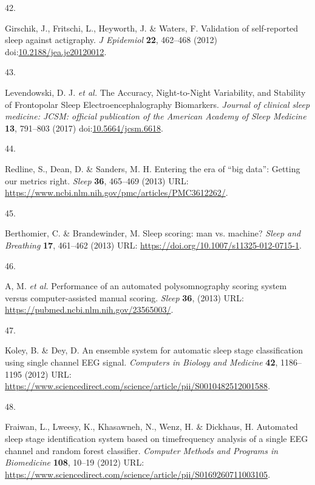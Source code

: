 \documentclass[
  10pt,
]{scrbook}
\newlength{\cslhangindent}
\newlength{\csllabelwidth}
\newlength{\cslentryspacingunit} %
\newenvironment{CSLReferences}[2] %
 {%
  \setlength{\parindent}{0pt}
  \ifodd #1
  \let\oldpar\par
  \def\par{\hangindent=\cslhangindent\oldpar}
  \fi
  \setlength{\parskip}{#2\cslentryspacingunit}
 }%
 {}
\newcommand{\CSLLeftMargin}[1]{\parbox[t]{\csllabelwidth}{#1}}
\newcommand{\CSLRightInline}[1]{\parbox[t]{\linewidth - \csllabelwidth}{#1}\break}
\begin{document}
\begin{CSLReferences}{0}{0}
\leavevmode{}%
\CSLLeftMargin{42. }%
\CSLRightInline{Girschik, J., Fritschi, L., Heyworth, J. \& Waters, F.
Validation of self-reported sleep against actigraphy. \emph{J Epidemiol}
\textbf{22}, 462--468 (2012)
doi:\href{https://doi.org/10.2188/jea.je20120012}{10.2188/jea.je20120012}.}

\leavevmode{}%
\CSLLeftMargin{43. }%
\CSLRightInline{Levendowski, D. J. \emph{et al.} The Accuracy,
Night-to-Night Variability, and Stability of Frontopolar Sleep
Electroencephalography Biomarkers. \emph{Journal of clinical sleep
medicine: JCSM: official publication of the American Academy of Sleep
Medicine} \textbf{13}, 791--803 (2017)
doi:\href{https://doi.org/10.5664/jcsm.6618}{10.5664/jcsm.6618}.}

\leavevmode{}%
\CSLLeftMargin{44. }%
\CSLRightInline{Redline, S., Dean, D. \& Sanders, M. H. Entering the era
of {``}big data{''}: Getting our metrics right. \emph{Sleep}
\textbf{36}, 465--469 (2013) URL:
\url{https://www.ncbi.nlm.nih.gov/pmc/articles/PMC3612262/}.}

\leavevmode{}%
\CSLLeftMargin{45. }%
\CSLRightInline{Berthomier, C. \& Brandewinder, M. Sleep scoring: man
vs. machine? \emph{Sleep and Breathing} \textbf{17}, 461--462 (2013)
URL: \url{https://doi.org/10.1007/s11325-012-0715-1}.}

\leavevmode{}%
\CSLLeftMargin{46. }%
\CSLRightInline{A, M. \emph{et al.} Performance of an automated
polysomnography scoring system versus computer-assisted manual scoring.
\emph{Sleep} \textbf{36}, (2013) URL:
\url{https://pubmed.ncbi.nlm.nih.gov/23565003/}.}

\leavevmode{}%
\CSLLeftMargin{47. }%
\CSLRightInline{Koley, B. \& Dey, D. An ensemble system for automatic
sleep stage classification using single channel EEG signal.
\emph{Computers in Biology and Medicine} \textbf{42}, 1186--1195 (2012)
URL:
\url{https://www.sciencedirect.com/science/article/pii/S0010482512001588}.}

\leavevmode{}%
\CSLLeftMargin{48. }%
\CSLRightInline{Fraiwan, L., Lweesy, K., Khasawneh, N., Wenz, H. \&
Dickhaus, H. Automated sleep stage identification system based on
time{\textendash}frequency analysis of a single EEG channel and random
forest classifier. \emph{Computer Methods and Programs in Biomedicine}
\textbf{108}, 10--19 (2012) URL:
\url{https://www.sciencedirect.com/science/article/pii/S0169260711003105}.}


\end{CSLReferences}
\end{document}
